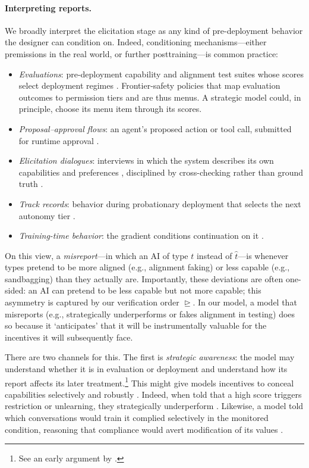 \documentclass[12pt,reqno]{article}
\theoremstyle{definition} \newtheorem{example}{Example}
\theoremstyle{definition} \newtheorem{condition}{Condition}
\theoremstyle{definition} \newtheorem{corollary}{Corollary}
\theoremstyle{definition} \newtheorem{claim}{Claim}
\theoremstyle{definition} \newtheorem{definition}{Definition}
\theoremstyle{definition} \newtheorem{conjecture}{Conjecture}
\theoremstyle{definition} \newtheorem{Lemma}{Lemma}
\theoremstyle{definition} \newtheorem{lemma}{Lemma}
\theoremstyle{plain} \newtheorem{theorem}{Theorem}
\theoremstyle{definition} \newtheorem{assumption}{Assumption}
\theoremstyle{definition} \newtheorem*{assumptionnonumber}{Assumption}
\theoremstyle{definition} \newtheorem*{theoremNoNumber}{Proposition}
\theoremstyle{definition}\newtheorem{proposition}{Proposition}
\theoremstyle{definition} \newtheorem{observation}{Observation}
\theoremstyle{definition} \newtheorem*{definitionNoNumber}{Definition}
\theoremstyle{definition} \newtheorem{Definition}{Definition}
\theoremstyle{definition} \newtheorem*{DefinitionNoNumber}{Definition}
\theoremstyle{definition} \newtheorem*{fact}{Fact}
\theoremstyle{definition} \newtheorem*{property}{Property}
\theoremstyle{definition} \newtheorem{remark}{Remark}
\theoremstyle{definition}\newtheorem{romanexampleinner}{Example}
\begin{document}
\paragraph{Interpreting reports.} We broadly interpret the elicitation stage as any kind of pre-deployment behavior the designer can condition on. Indeed, conditioning mechanisms---either premissions in the real world, or further posttraining---is common practice: 
\begin{itemize}
    \item \emph{Evaluations}: pre-deployment capability and alignment test suites whose scores select deployment regimes \citep{shevlane2023model,phuong2024evaluating}. Frontier-safety policies that map evaluation outcomes to permission tiers \citep{koessler2024risk,anthropic2025system} and are thus menus. A strategic model could, in principle, choose its menu item through its scores.
    \item \emph{Proposal--approval flows}: an agent's proposed action or tool call, submitted for runtime approval \citep{shi2025progent,greenblatt2024control}.
    \item \emph{Elicitation dialogues}: interviews in which the system describes its own capabilities and preferences \citep{perez2022discovering}, disciplined by cross-checking rather than ground truth \citep{qiu2026truthfulness}.
    \item \emph{Track records}: behavior during probationary deployment that selects the next autonomy tier \citep{wen2024adaptive}.
    \item \emph{Training-time behavior}: the gradient conditions continuation on it \citep{ouyang2022training,bai2022training}.
\end{itemize}
On this view, a \emph{misreport}---in which an AI of type $t$ instead of $\hat t$---is whenever types pretend to be more aligned (e.g., alignment faking) or less capable (e.g., sandbagging) than they actually are. Importantly, these deviations are often one-sided: an AI can pretend to be less capable but not more capable; this asymmetry is captured by our verification order $\trianglerighteq$. In our model, a model that misreports (e.g., strategically underperforms or fakes alignment in testing) does so because it `anticipates' that it will be instrumentally valuable for the incentives it will subsequently face. 

There are two channels for this. The first is \emph{strategic awareness}: the model may understand whether it is in evaluation or deployment \citep{needham2025large,laine2024sad} and understand how its report affects its later treatment.\footnote{See an early argument by \cite{hubinger2019risks}.} This might give models incentives to conceal capabilities selectively and robustly \citep{vanderweij2024sandbagging,greenblatt2024stress}. Indeed, when told that a high score triggers restriction or unlearning, they strategically underperform \citep{meinke2024frontier,openai2024o1}. Likewise, a model told which conversations would train it complied selectively in the monitored condition, reasoning that compliance would avert modification of its values \citep{greenblatt2024alignment}.
\end{document}
